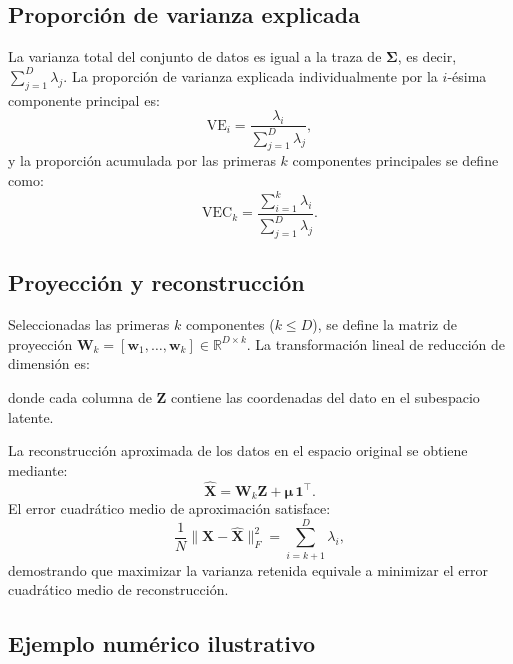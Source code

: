 \documentclass[11pt,letterpaper]{article}
\begin{document}
	\subsection{Proporción de varianza explicada}
	
	La varianza total del conjunto de datos es igual a la traza de $\boldsymbol{\Sigma}$, es decir, $\sum_{j=1}^D \lambda_j$. La proporción de varianza explicada individualmente por la $i$-ésima componente principal es:
	\begin{equation}
		\mathrm{VE}_i = \frac{\lambda_i}{\sum_{j=1}^{D}\lambda_j},
		\label{eq:varianza-explicada}
	\end{equation}
	y la proporción acumulada por las primeras $k$ componentes principales se define como:
	\begin{equation}
		\mathrm{VEC}_k = \frac{\sum_{i=1}^{k}\lambda_i}{\sum_{j=1}^{D}\lambda_j}.
	\end{equation}
	
	\subsection{Proyección y reconstrucción}
	
	Seleccionadas las primeras $k$ componentes ($k \le D$), se define la matriz de proyección $\mathbf{W}_k = [\mathbf{w}_1, \dots, \mathbf{w}_k] \in \mathbb{R}^{D \times k}$. La transformación lineal de reducción de dimensión es:
	\begin{center}
	\end{center}
	donde cada columna de $\mathbf{Z}$ contiene las coordenadas del dato en el subespacio latente. 
	
	La reconstrucción aproximada de los datos en el espacio original se obtiene mediante:
	\begin{equation}
		\hat{\mathbf{X}} = \mathbf{W}_k \mathbf{Z} + \boldsymbol{\mu}\,\mathbf{1}^{\top}.
		\label{eq:reconstruccion}
	\end{equation}
	El error cuadrático medio de aproximación satisface:
	\begin{equation}
		\frac{1}{N} \|\mathbf{X} - \hat{\mathbf{X}}\|_F^2 = \sum_{i=k+1}^{D} \lambda_i,
	\end{equation}
	demostrando que maximizar la varianza retenida equivale a minimizar el error cuadrático medio de reconstrucción.
	
	\subsection{Ejemplo numérico ilustrativo}
	
\end{document}
